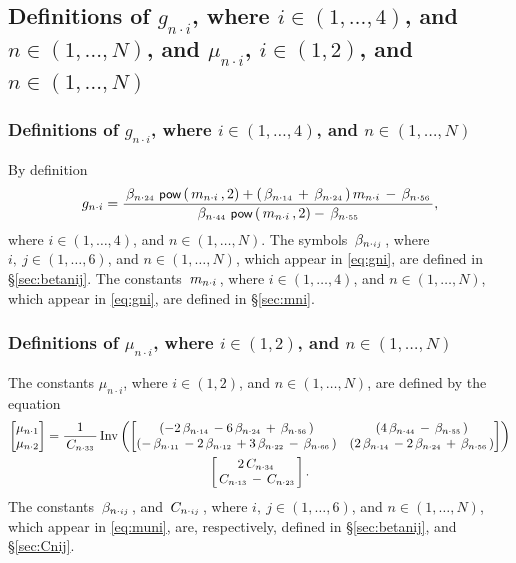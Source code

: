 \documentclass[preprint,12pt,times]{elsarticle}
\numberwithin{equation}{section}
\newcommand{\pr}[1]{\left( #1 \right)}
\newcommand{\p}{\,\textsf{\small pow}}
\newcommand{\Inv}{\,\mathrm{Inv}}
\newcommand{\msub}[2]{
\IfEqCase{#2}{
      {i}{\, m_{#1\cdot #2}\,}%
  }[\,m_{#1\cdot {\scriptscriptstyle #2}}\,]}
\newcommand{\gsub}[2]{g_{#1\cdot #2}}
\newcommand{\musub}[2]{\mu_{#1\cdot #2}}
\newcommand{\betasub}[2]{
\IfEqCase{#2}{
       {xxxx}{\,\beta_{ {#1}\cdot { #2}}\,}%
   }[\,\beta_{ {#1}\cdot {\scriptscriptstyle #2}}\,]}
\newcommand{\Csub}[2]{
   \IfEqCase{#2}{
          {xxxx}{\,\beta_{ {#1}\cdot { #2}}\,}%
      }[\,C_{ {#1}\cdot {\scriptscriptstyle #2}}\,]}
\newcommand{\intwo}{\in(1,2)}
\newcommand{\infour}{\in(1,\ldots,4)}
\newcommand{\insix}{\in(1,\ldots,6)}
\newcommand{\inN}{\in(1,\ldots,N)}
\renewcommand{\>}{$\Rightarrow$}
\begin{document}
\subsection{Definitions of $\gsub{n}{i}$, where $i\infour$, and $n\inN$, and $\musub{n}{i}$, $i\intwo $, and $n\inN$}
\label{sec:gmuni}%

\subsubsection{Definitions of $\gsub{n}{i}$, where $i\infour$, and $n\inN$}
\label{sec:gni}%

By definition
	\begin{equation}
	\gsub{n}{i} = \frac{\betasub{n}{24}\p\pr{\msub{n}{i},2}+(\betasub{n}{14} + \betasub{n}{24})\msub{n}{i} - \betasub{n}{56}}{\betasub{n}{44}\p\pr{\msub{n}{i},2} - \betasub{n}{55}},
\label{eq:gni}
	\end{equation}
where $i\infour$, and $n\inN$. %
The symbols $\betasub{n}{ij}$, where $i,~j\insix$, and $n\inN$, which appear in \eqref{eq:gni}, are defined in \S\ref{sec:betanij}.%
The constants $\msub{n}{i}$, where $i\infour$, and $n\inN$, which appear in \eqref{eq:gni}, are defined in \S\ref{sec:mni}.%



\subsubsection{Definitions of $\musub{n}{i}$, where $i\in (1,2)$, and $n\in (1,\ldots,N)$}%
\label{sec:muni}

The constants $\musub{n}{i}$, where $i\in (1,2)$, and $n\in (1,\ldots,N)$, are defined by the equation
	\begin{multline}
	\begin{bmatrix}
		\musub{n}{1} \\ \musub{n}{2}
	\end{bmatrix} =
	\frac{1}{\Csub{n}{33}}
	\Inv \pr{\begin{bmatrix}
		\pr{-2\betasub{n}{14}-6\betasub{n}{24}+\betasub{n}{56}} & \pr{4\betasub{n}{44}-\betasub{n}{55}} \\
		\pr{-\betasub{n}{11}-2\betasub{n}{12}+3\betasub{n}{22}-\betasub{n}{66}} & \pr{2\betasub{n}{14}-2\betasub{n}{24}+\betasub{n}{56}}
	\end{bmatrix}}\\ 
	\begin{bmatrix}
			2\Csub{n}{34} \\ \Csub{n}{13}-\Csub{n}{23}
	\end{bmatrix}.
\label{eq:muni}	
\end{multline} %
The constants $\betasub{n}{ij}$, and $\Csub{n}{ij}$, where $i,~j\insix$, and $n\inN$, which appear in \eqref{eq:muni}, are, respectively, defined in \S\ref{sec:betanij}, and \S\ref{sec:Cnij}. %
\end{document}
